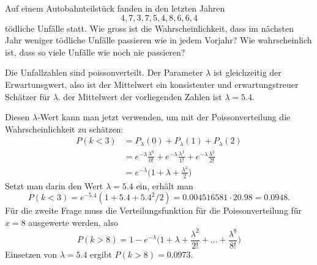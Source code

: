 Auf einem Autobahnteilstück fanden in den letzten Jahren
\[
4, 7, 3, 7, 5, 4, 8, 6, 6, 4
\]
tödliche Unfälle statt.
Wie gross ist die Wahrscheinlichkeit, dass im nächsten Jahr
weniger tödliche Unfälle passieren wie in jedem Vorjahr?
Wie wahrscheinlich ist, dass so viele Unfälle wie noch nie
passieren?

\begin{loesung}
Die Unfallzahlen sind poissonverteilt.
Der Parameter $\lambda$ ist gleichzeitig der Erwartunsgwert, also
ist der Mittelwert ein konsistenter und erwartungstreuer Schätzer
für $\lambda$. der Mittelwert der vorliegenden Zahlen ist $\lambda=5.4$.

Diesen $\lambda$-Wert kann man jetzt verwenden, um mit der Poissonverteilung
die Wahrscheinlichkeit zu schätzen:
\begin{align*}
P(k<3)&=
P_\lambda(0)
+
P_\lambda(1)
+
P_\lambda(2)
\\
&=
e^{-\lambda}\frac{\lambda^0}{0!}
+
e^{-\lambda}\frac{\lambda^1}{1!}
+
e^{-\lambda}\frac{\lambda^2}{2!}
\\
&=
e^{-\lambda}\biggl(1+\lambda+\frac{\lambda^2}{2}\biggr)
\end{align*}
Setzt man darin den Wert $\lambda=5.4$ ein, erhält man
\[
P(k<3)=e^{-5.4}(1+5.4+5.4^2/2)=0.004516581\cdot 20.98= 0.0948.
\]
Für die zweite Frage muss die Verteilungsfunktion für die
Poissonverteilung für $x=8$ ausgewerte werden, also
\[
P(k>8)=
1-e^{-\lambda}\biggl(
1+\lambda+\frac{\lambda^2}{2!}+\dots+\frac{\lambda^8}{8!}
\biggr)
\]
Einsetzen von $\lambda=5.4$ ergibt $P(k>8)=0.0973$.
\end{loesung}

